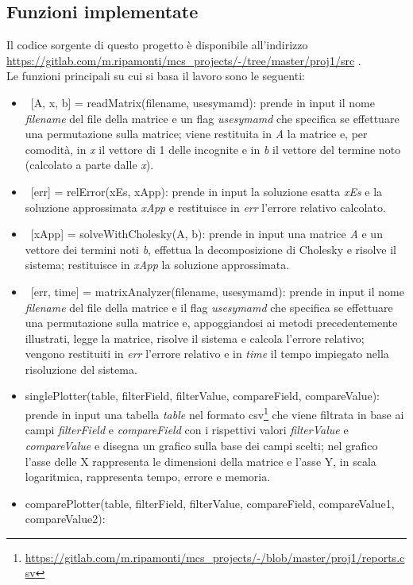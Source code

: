 \subsection{Funzioni implementate}
Il codice sorgente di questo progetto è disponibile all'indirizzo \url{https://gitlab.com/m.ripamonti/mcs_projects/-/tree/master/proj1/src} .\\
Le funzioni principali su cui si basa il lavoro sono le seguenti:
\begin{itemize}
    \item~[A, x, b] = readMatrix(filename, usesymamd): prende in input il nome \emph{filename} 
    del file della matrice e un flag \emph{usesymamd} che specifica se effettuare una permutazione 
    sulla matrice; viene restituita in \emph{A} la matrice e, per comodità, in \emph{x} il vettore di 1 delle 
    incognite e in \emph{b} il vettore del termine noto (calcolato a parte dalle \emph{x}).
    \item~[err] = relError(xEs, xApp): prende in input la soluzione esatta \emph{xEs} e la soluzione approssimata \emph{xApp} e restituisce 
    in \emph{err} l'errore relativo calcolato.
    \item~[xApp] = solveWithCholesky(A, b): prende in input una matrice \emph{A} e un vettore dei termini noti \emph{b}, effettua la decomposizione 
    di Cholesky e risolve il sistema; restituisce in \emph{xApp} la soluzione approssimata.
    \item~[err, time] =  matrixAnalyzer(filename, usesymamd): prende in input il nome \emph{filename} del file della matrice e il flag 
    \emph{usesymamd} che specifica se effettuare una permutazione sulla matrice e, appoggiandosi ai metodi precedentemente illustrati, 
    legge la matrice, risolve il sistema e calcola l'errore relativo; vengono restituiti in \emph{err} l'errore relativo e in \emph{time} il tempo impiegato nella risoluzione del sistema.
    \item singlePlotter(table, filterField, filterValue, compareField, compareValue): prende in input 
    una tabella \emph{table} nel formato csv\footnote{\url{https://gitlab.com/m.ripamonti/mcs_projects/-/blob/master/proj1/reports.csv}}
    che viene filtrata in base ai campi \emph{filterField} e \emph{compareField} 
    con i rispettivi valori \emph{filterValue} e \emph{compareValue} e disegna un grafico sulla base dei campi scelti; nel grafico 
    l'asse delle X rappresenta le dimensioni della matrice e l'asse Y, in scala logaritmica, rappresenta tempo, errore e memoria.
    \item comparePlotter(table, filterField, filterValue, compareField, compareValue1, compareValue2): 

\end{itemize}
